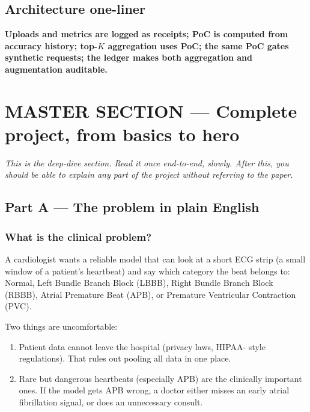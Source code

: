 \documentclass[11pt,a4paper]{article}
\begin{document}
\subsection{Architecture one-liner}
\textbf{Uploads and metrics are logged as receipts; PoC is computed from accuracy history; top-$K$ aggregation uses PoC; the same PoC gates synthetic requests; the ledger makes both aggregation and augmentation auditable.}

\newpage
\section{MASTER SECTION --- Complete project, from basics to hero}
\label{sec:master}

\textit{This is the deep-dive section. Read it once end-to-end, slowly.
After this, you should be able to explain any part of the project
without referring to the paper.}

\subsection{Part A --- The problem in plain English}

\subsubsection{What is the clinical problem?}
A cardiologist wants a reliable model that can look at a short ECG
strip (a small window of a patient's heartbeat) and say which
category the beat belongs to: Normal, Left Bundle Branch Block
(LBBB), Right Bundle Branch Block (RBBB), Atrial Premature Beat
(APB), or Premature Ventricular Contraction (PVC).

Two things are uncomfortable:
\begin{enumerate}
\item Patient data cannot leave the hospital (privacy laws, HIPAA-
style regulations). That rules out pooling all data in one place.
\item Rare but dangerous heartbeats (especially APB) are the
clinically important ones. If the model gets APB wrong, a doctor
either misses an early atrial fibrillation signal, or does an
unnecessary consult.
\end{enumerate}
\end{document}
